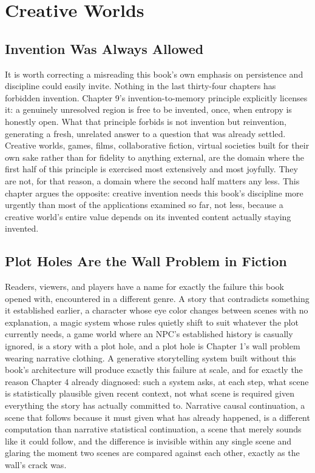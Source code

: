 \chapter{Creative Worlds}

\section{Invention Was Always Allowed}

It is worth correcting a misreading this book's own emphasis on persistence and discipline could easily invite. Nothing in the last thirty-four chapters has forbidden invention. Chapter 9's invention-to-memory principle explicitly licenses it: a genuinely unresolved region is free to be invented, once, when entropy is honestly open. What that principle forbids is not invention but reinvention, generating a fresh, unrelated answer to a question that was already settled. Creative worlds, games, films, collaborative fiction, virtual societies built for their own sake rather than for fidelity to anything external, are the domain where the first half of this principle is exercised most extensively and most joyfully. They are not, for that reason, a domain where the second half matters any less. This chapter argues the opposite: creative invention needs this book's discipline more urgently than most of the applications examined so far, not less, because a creative world's entire value depends on its invented content actually staying invented.

\section{Plot Holes Are the Wall Problem in Fiction}

Readers, viewers, and players have a name for exactly the failure this book opened with, encountered in a different genre. A story that contradicts something it established earlier, a character whose eye color changes between scenes with no explanation, a magic system whose rules quietly shift to suit whatever the plot currently needs, a game world where an NPC's established history is casually ignored, is a story with a plot hole, and a plot hole is Chapter 1's wall problem wearing narrative clothing. A generative storytelling system built without this book's architecture will produce exactly this failure at scale, and for exactly the reason Chapter 4 already diagnosed: such a system asks, at each step, what scene is statistically plausible given recent context, not what scene is required given everything the story has actually committed to. Narrative causal continuation, a scene that follows because it must given what has already happened, is a different computation than narrative statistical continuation, a scene that merely sounds like it could follow, and the difference is invisible within any single scene and glaring the moment two scenes are compared against each other, exactly as the wall's crack was.


